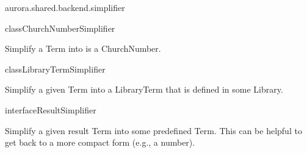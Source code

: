 \begin{texdocpackage}{aurora.shared.backend.simplifier}
\label{texdoclet:aurora.shared.backend.simplifier}

\begin{texdocclass}{class}{ChurchNumberSimplifier}
\label{texdoclet:aurora.shared.backend.simplifier.ChurchNumberSimplifier}
\begin{texdocclassintro}
Simplify a Term into is a ChurchNumber.\end{texdocclassintro}
\begin{texdocclassconstructors}
\end{texdocclassconstructors}
\begin{texdocclassmethods}
\end{texdocclassmethods}
\end{texdocclass}


\begin{texdocclass}{class}{LibraryTermSimplifier}
\label{texdoclet:aurora.shared.backend.simplifier.LibraryTermSimplifier}
\begin{texdocclassintro}
Simplify a given Term into a LibraryTerm that is defined in some Library.\end{texdocclassintro}
\begin{texdocclassconstructors}
\end{texdocclassconstructors}
\begin{texdocclassmethods}
\end{texdocclassmethods}
\end{texdocclass}


\begin{texdocclass}{interface}{ResultSimplifier}
\label{texdoclet:aurora.shared.backend.simplifier.ResultSimplifier}
\begin{texdocclassintro}
Simplify a given result Term into some predefined Term.
 This can be helpful to get back to a more compact form (e.g., a number).\end{texdocclassintro}
\begin{texdocclassmethods}
\end{texdocclassmethods}
\end{texdocclass}


\end{texdocpackage}



